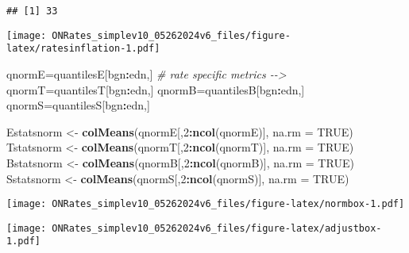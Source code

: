 \documentclass[
]{article}
\newenvironment{Shaded}{\begin{snugshade}}{\end{snugshade}}
\newcommand{\AttributeTok}[1]{\textcolor[rgb]{0.13,0.29,0.53}{#1}}
\newcommand{\CommentTok}[1]{\textcolor[rgb]{0.56,0.35,0.01}{\textit{#1}}}
\newcommand{\ConstantTok}[1]{\textcolor[rgb]{0.56,0.35,0.01}{#1}}
\newcommand{\DecValTok}[1]{\textcolor[rgb]{0.00,0.00,0.81}{#1}}
\newcommand{\FunctionTok}[1]{\textcolor[rgb]{0.13,0.29,0.53}{\textbf{#1}}}
\newcommand{\NormalTok}[1]{#1}
\newcommand{\OtherTok}[1]{\textcolor[rgb]{0.56,0.35,0.01}{#1}}
\newcommand{\SpecialCharTok}[1]{\textcolor[rgb]{0.81,0.36,0.00}{\textbf{#1}}}
\let\origfigure\figure
\let\endorigfigure\endfigure
\renewenvironment{figure}[1][2] {
    \expandafter\origfigure\expandafter[H]
} {
    \endorigfigure
}
\begin{document}
\begin{verbatim}
## [1] 33
\end{verbatim}

\begin{figure}
\centering
\texttt{[image: ONRates\_simplev10\_05262024v6\_files/figure-latex/ratesinflation-1.pdf]}
\caption{\label{fig:ratesinflation}EFFR during inflation period 3/17/2022-12/14/2023}
\end{figure}

\begin{Shaded}
\begin{Highlighting}[]
\NormalTok{qnormE}\OtherTok{=}\NormalTok{quantilesE[bgn}\SpecialCharTok{:}\NormalTok{edn,] }\CommentTok{\# rate specific metrics  {-}{-}\textgreater{}}
\NormalTok{qnormT}\OtherTok{=}\NormalTok{quantilesT[bgn}\SpecialCharTok{:}\NormalTok{edn,] }
\NormalTok{qnormB}\OtherTok{=}\NormalTok{quantilesB[bgn}\SpecialCharTok{:}\NormalTok{edn,] }
\NormalTok{qnormS}\OtherTok{=}\NormalTok{quantilesS[bgn}\SpecialCharTok{:}\NormalTok{edn,] }

\NormalTok{Estatsnorm }\OtherTok{\textless{}{-}} \FunctionTok{colMeans}\NormalTok{(qnormE[,}\DecValTok{2}\SpecialCharTok{:}\FunctionTok{ncol}\NormalTok{(qnormE)], }\AttributeTok{na.rm =} \ConstantTok{TRUE}\NormalTok{)}
\NormalTok{Tstatsnorm }\OtherTok{\textless{}{-}} \FunctionTok{colMeans}\NormalTok{(qnormT[,}\DecValTok{2}\SpecialCharTok{:}\FunctionTok{ncol}\NormalTok{(qnormT)], }\AttributeTok{na.rm =} \ConstantTok{TRUE}\NormalTok{)}
\NormalTok{Bstatsnorm }\OtherTok{\textless{}{-}} \FunctionTok{colMeans}\NormalTok{(qnormB[,}\DecValTok{2}\SpecialCharTok{:}\FunctionTok{ncol}\NormalTok{(qnormB)], }\AttributeTok{na.rm =} \ConstantTok{TRUE}\NormalTok{)}
\NormalTok{Sstatsnorm }\OtherTok{\textless{}{-}} \FunctionTok{colMeans}\NormalTok{(qnormS[,}\DecValTok{2}\SpecialCharTok{:}\FunctionTok{ncol}\NormalTok{(qnormS)], }\AttributeTok{na.rm =} \ConstantTok{TRUE}\NormalTok{)}
\end{Highlighting}
\end{Shaded}

\begin{figure}
\centering
\texttt{[image: ONRates\_simplev10\_05262024v6\_files/figure-latex/normbox-1.pdf]}
\caption{\label{fig:normbox}IQR and range during normalcy period 3/4/2016-7/31/2019}
\end{figure}

\begin{figure}
\centering
\texttt{[image: ONRates\_simplev10\_05262024v6\_files/figure-latex/adjustbox-1.pdf]}
\caption{\label{fig:adjustbox}IQR and range of rates during mid cycle adustment period 8/1/2019-10/31/2019}
\end{figure}
\end{document}
